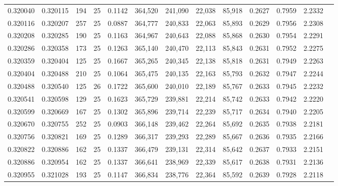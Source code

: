 \begin{tabular}{rrrrrrrrrrrrr}
0.320040 & 0.320115 &   194 &  25 &                                     0.1142 & 364,520 & 241,090 &  22,038 &  85,918 & 0.2627 & 0.7959 & 2.2332 \\
0.320116 & 0.320207 &   257 &  25 &                                     0.0887 & 364,777 & 240,833 &  22,063 &  85,893 & 0.2629 & 0.7956 & 2.2308 \\
0.320208 & 0.320285 &   190 &  25 &                                     0.1163 & 364,967 & 240,643 &  22,088 &  85,868 & 0.2630 & 0.7954 & 2.2291 \\
0.320286 & 0.320358 &   173 &  25 &                                     0.1263 & 365,140 & 240,470 &  22,113 &  85,843 & 0.2631 & 0.7952 & 2.2275 \\
0.320359 & 0.320404 &   125 &  25 &                                     0.1667 & 365,265 & 240,345 &  22,138 &  85,818 & 0.2631 & 0.7949 & 2.2263 \\
0.320404 & 0.320488 &   210 &  25 &                                     0.1064 & 365,475 & 240,135 &  22,163 &  85,793 & 0.2632 & 0.7947 & 2.2244 \\
0.320488 & 0.320540 &   125 &  26 &                                     0.1722 & 365,600 & 240,010 &  22,189 &  85,767 & 0.2633 & 0.7945 & 2.2232 \\
0.320541 & 0.320598 &   129 &  25 &                                     0.1623 & 365,729 & 239,881 &  22,214 &  85,742 & 0.2633 & 0.7942 & 2.2220 \\
0.320599 & 0.320669 &   167 &  25 &                                     0.1302 & 365,896 & 239,714 &  22,239 &  85,717 & 0.2634 & 0.7940 & 2.2205 \\
0.320670 & 0.320755 &   252 &  25 &                                     0.0903 & 366,148 & 239,462 &  22,264 &  85,692 & 0.2635 & 0.7938 & 2.2181 \\
0.320756 & 0.320821 &   169 &  25 &                                     0.1289 & 366,317 & 239,293 &  22,289 &  85,667 & 0.2636 & 0.7935 & 2.2166 \\
0.320822 & 0.320886 &   162 &  25 &                                     0.1337 & 366,479 & 239,131 &  22,314 &  85,642 & 0.2637 & 0.7933 & 2.2151 \\
0.320886 & 0.320954 &   162 &  25 &                                     0.1337 & 366,641 & 238,969 &  22,339 &  85,617 & 0.2638 & 0.7931 & 2.2136 \\
0.320955 & 0.321028 &   193 &  25 &                                     0.1147 & 366,834 & 238,776 &  22,364 &  85,592 & 0.2639 & 0.7928 & 2.2118 \\

\end{tabular}
